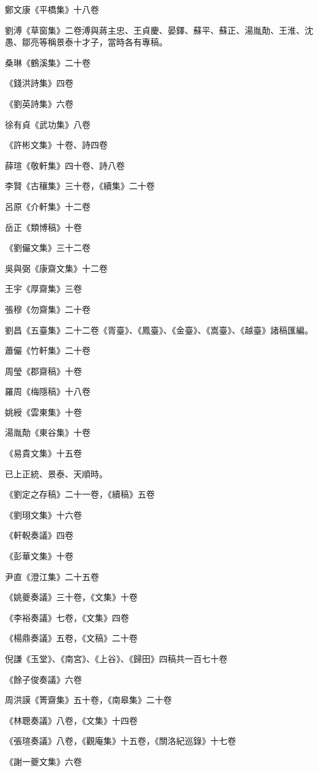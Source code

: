 鄭文康《平橋集》十八卷

劉溥《草窗集》二卷溥與蔣主忠、王貞慶、晏鐸、蘇平、蘇正、湯胤勣、王淮、沈愚、鄒亮等稱景泰十才子，當時各有專稿。

桑琳《鶴溪集》二十卷

《錢洪詩集》四卷

《劉英詩集》六卷

徐有貞《武功集》八卷

《許彬文集》十卷、詩四卷

薛瑄《敬軒集》四十卷、詩八卷

李賢《古穰集》三十卷，《續集》二十卷

呂原《介軒集》十二卷

岳正《類博稿》十卷

《劉儼文集》三十二卷

吳與弼《康齋文集》十二卷

王宇《厚齋集》三卷

張穆《勿齋集》二十卷

劉昌《五臺集》二十二卷《胥臺》、《鳳臺》、《金臺》、《嵩臺》、《越臺》諸稿匯編。

蕭儼《竹軒集》二十卷

周瑩《郡齋稿》十卷

羅周《梅隱稿》十八卷

姚綬《雲東集》十卷

湯胤勣《東谷集》十卷

《易貴文集》十五卷

已上正統、景泰、天順時。

《劉定之存稿》二十一卷，《續稿》五卷

《劉珝文集》十六卷

《軒輗奏議》四卷

《彭華文集》十卷

尹直《澄江集》二十五卷

《姚夔奏議》三十卷，《文集》十卷

《李裕奏議》七卷，《文集》四卷

《楊鼎奏議》五卷，《文稿》二十卷

倪謙《玉堂》、《南宮》、《上谷》、《歸田》四稿共一百七十卷

《餘子俊奏議》六卷

周洪謨《箐齋集》五十卷，《南皋集》二十卷

《林聰奏議》八卷，《文集》十四卷

《張瑄奏議》八卷，《觀庵集》十五卷，《關洛紀巡錄》十七卷

《謝一夔文集》六卷

